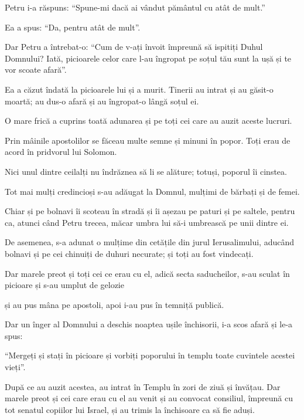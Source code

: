 {Petru i-a răspuns: “Spune-mi dacă ai vândut pământul cu atât de mult.”

\par }{\PP Ea a spus: “Da, pentru atât de mult”.


\par }{\PP {}Dar Petru a întrebat-o: “Cum de v-ați învoit împreună să ispitiți Duhul Domnului? Iată, picioarele celor care l-au îngropat pe soțul tău sunt la ușă și te vor scoate afară”.


\par }{\PP {}Ea a căzut îndată la picioarele lui și a murit. Tinerii au intrat și au găsit-o moartă; au dus-o afară și au îngropat-o lângă soțul ei.

O mare frică a cuprins toată adunarea și pe toți cei care au auzit aceste lucruri.


\par }{\PP {}Prin mâinile apostolilor se făceau multe semne și minuni în popor. Toți erau de acord în pridvorul lui Solomon.

Nici unul dintre ceilalți nu îndrăznea să li se alăture; totuși, poporul îi cinstea.

Tot mai mulți credincioși s-au adăugat la Domnul, mulțimi de bărbați și de femei.

Chiar și pe bolnavi îi scoteau în stradă și îi așezau pe paturi și pe saltele, pentru ca, atunci când Petru trecea, măcar umbra lui să-i umbrească pe unii dintre ei.

De asemenea, s-a adunat o mulțime din cetățile din jurul Ierusalimului, aducând bolnavi și pe cei chinuiți de duhuri necurate; și toți au fost vindecați.


\par }{\PP {}Dar marele preot și toți cei ce erau cu el, adică secta saducheilor, s-au sculat în picioare și s-au umplut de gelozie

și au pus mâna pe apostoli, apoi i-au pus în temniță publică.

Dar un înger al Domnului a deschis noaptea ușile închisorii, i-a scos afară și le-a spus:

“Mergeți și stați în picioare și vorbiți poporului în templu toate cuvintele acestei vieți”.


\par }{\PP {}După ce au auzit acestea, au intrat în Templu în zori de ziuă și învățau. Dar marele preot și cei care erau cu el au venit și au convocat consiliul, împreună cu tot senatul copiilor lui Israel, și au trimis la închisoare ca să fie aduși.

}
